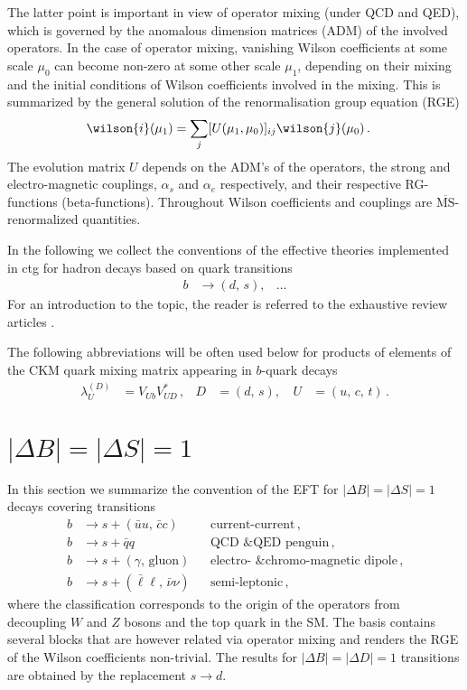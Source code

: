 The latter point
is important in view of operator mixing (under QCD and QED), which is governed by
the anomalous dimension matrices (ADM) of the involved operators. In the case of
operator mixing, vanishing Wilson coefficients at some scale $\mu_0$ can become 
non-zero at some other scale $\mu_1$, depending on their mixing and the initial
conditions of Wilson coefficients involved in the mixing. This is summarized
by the general solution of the renormalisation group equation (RGE)
\begin{align}
  \wilson{i}(\mu_1) & = \sum_j [U(\mu_1, \mu_0)]_{ij} \wilson{j}(\mu_0)\,.
\end{align}
The evolution matrix $U$ depends on the ADM's of the operators, the strong
and electro-magnetic couplings, $\alpha_s$ and $\alpha_e$ respectively, and
their respective RG-functions (beta-functions). Throughout Wilson coefficients
and couplings are $\overline{\text{MS}}$-renormalized quantities.

In the following we collect the conventions of the effective theories implemented
in ctg for hadron decays based on quark transitions
\begin{align}
  b & \to (d,\, s), & \ldots
\end{align}
For an introduction to the topic, the reader is referred to the exhaustive review
articles \cite{Buchalla:1995vs, Buras:1998raa}. 

The following abbreviations will be often used below for products of elements
of the CKM quark mixing matrix appearing in $b$-quark decays
\begin{align}
  \lambda_U^{(D)} & = V_{Ub}^{} V_{UD}^* \,, &
  D & = (d,\,s), \, &
  U & = (u,\,c,\,t) \,.
\end{align}

%
%

\section{$|\Delta B| = |\Delta S| = 1$}

In this section we summarize the convention of the EFT for $|\Delta B| = |\Delta S| = 1$
decays covering transitions
\begin{align*}
  b & \to s + (\bar{u}u,\, \bar{c}c)           && \mbox{current-current} \,,
\\
  b & \to s + \bar{q}q                         && \mbox{QCD \& QED penguin} \,,
\\
  b & \to s + (\gamma,\, \mbox{gluon})         && \mbox{electro- \& chromo-magnetic dipole} \,,
\\
  b & \to s + (\bar{\ell}\ell,\, \bar{\nu}\nu) && \mbox{semi-leptonic} \,,
\end{align*}
where the classification corresponds to the origin of the operators from 
decoupling $W$ and $Z$ bosons and the top quark in the SM. The basis contains several
blocks that are however related via operator mixing and renders the RGE of the
Wilson coefficients non-trivial. The results for $|\Delta B| = |\Delta D| = 1$
transitions are obtained by the replacement $s\to d$.
 
